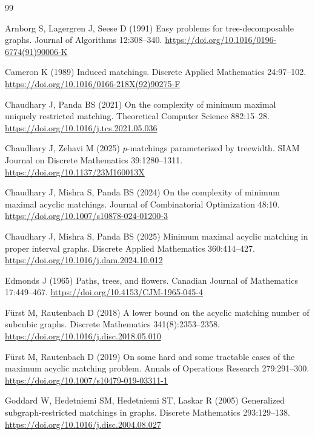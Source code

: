 \documentclass[smallextended,natbib,nospthms]{svjour3}
\theoremstyle{definition}
\theoremstyle{remark}
\begin{document}
\begin{thebibliography}{99}

Arnborg S, Lagergren J, Seese D (1991) Easy problems for tree-decomposable
graphs. Journal of Algorithms 12:308--340.
\url{https://doi.org/10.1016/0196-6774(91)90006-K}

Cameron K (1989) Induced matchings. Discrete Applied Mathematics 24:97--102.
\url{https://doi.org/10.1016/0166-218X(92)90275-F}

Chaudhary J, Panda BS (2021) On the complexity of minimum maximal uniquely
restricted matching. Theoretical Computer Science 882:15--28.
\url{https://doi.org/10.1016/j.tcs.2021.05.036}

Chaudhary J, Zehavi M (2025) $p$-matchings parameterized by treewidth.
SIAM Journal on Discrete Mathematics 39:1280--1311.
\url{https://doi.org/10.1137/23M160013X}

Chaudhary J, Mishra S, Panda BS (2024) On the complexity of minimum maximal
acyclic matchings. Journal of Combinatorial Optimization 48:10.
\url{https://doi.org/10.1007/s10878-024-01200-3}

Chaudhary J, Mishra S, Panda BS (2025) Minimum maximal acyclic matching in
proper interval graphs. Discrete Applied Mathematics 360:414--427.
\url{https://doi.org/10.1016/j.dam.2024.10.012}

Edmonds J (1965) Paths, trees, and flowers. Canadian Journal of Mathematics
17:449--467. \url{https://doi.org/10.4153/CJM-1965-045-4}

F{\"u}rst M, Rautenbach D (2018) A lower bound on the acyclic matching number
of subcubic graphs. Discrete Mathematics 341(8):2353--2358.
\url{https://doi.org/10.1016/j.disc.2018.05.010}

F{\"u}rst M, Rautenbach D (2019) On some hard and some tractable cases of the
maximum acyclic matching problem. Annals of Operations Research 279:291--300.
\url{https://doi.org/10.1007/s10479-019-03311-1}

Goddard W, Hedetniemi SM, Hedetniemi ST, Laskar R (2005) Generalized
subgraph-restricted matchings in graphs. Discrete Mathematics 293:129--138.
\url{https://doi.org/10.1016/j.disc.2004.08.027}


\end{thebibliography}
\end{document}
